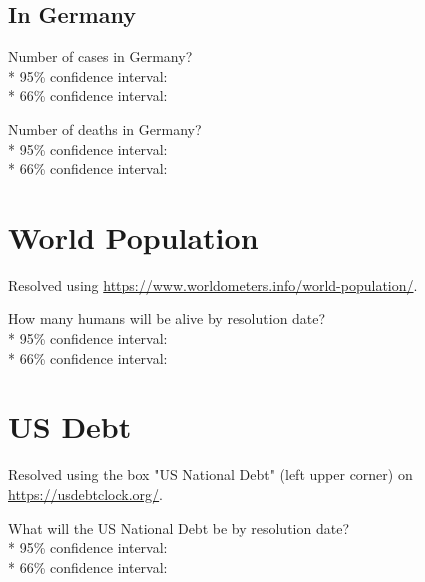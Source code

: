 \documentclass{article}
\begin{document}
\subsection*{In Germany}

Number of cases in Germany?\\*
95\% confidence interval: \null\hfill\underline{\hspace{8cm}}\\*
66\% confidence interval: \null\hfill\underline{\hspace{8cm}}

\vspace{0.5cm}

Number of deaths in Germany?\\*
95\% confidence interval: \null\hfill\underline{\hspace{8cm}}\\*
66\% confidence interval: \null\hfill\underline{\hspace{8cm}}

\section*{World Population}

Resolved using
\href{https://www.worldometers.info/world-population/}{https://www.worldometers.info/world-population/}.

\vspace{0.5cm}

How many humans will be alive by resolution date?\\*
95\% confidence interval: \null\hfill\underline{\hspace{8cm}}\\*
66\% confidence interval: \null\hfill\underline{\hspace{8cm}}

\section*{US Debt}

Resolved using the box "US National Debt" (left upper corner) on
\href{https://usdebtclock.org/}{https://usdebtclock.org/}.

\vspace{0.5cm}

What will the US National Debt be by resolution date?\\*
95\% confidence interval: \null\hfill\underline{\hspace{8cm}}\\*
66\% confidence interval: \null\hfill\underline{\hspace{8cm}}
\end{document}
